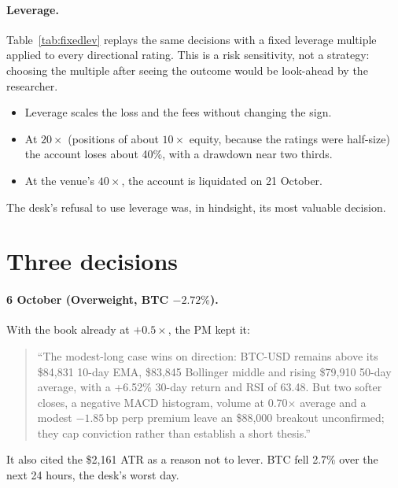 \begin{table}[t]\centering\small
\caption{The primary run's decisions under alternative cost models.}\label{tab:costs}

\end{table}

\paragraph{Leverage.} Table~\ref{tab:fixedlev} replays the same decisions with a fixed leverage multiple applied to every directional rating. This is a risk sensitivity, not a strategy: choosing the multiple after seeing the outcome would be look-ahead by the researcher.
\begin{itemize}
\item Leverage scales the loss and the fees without changing the sign.
\item At $20\times$ (positions of about $10\times$ equity, because the ratings were half-size) the account loses about 40\%, with a drawdown near two thirds.
\item At the venue's $40\times$, the account is liquidated on 21 October.
\end{itemize}
The desk's refusal to use leverage was, in hindsight, its most valuable decision.

\begin{table}[t]\centering\small
\caption{The same decisions with a fixed leverage multiple on every directional rating, with liquidation enforced on 15-minute bars at the venue's maintenance margin.}\label{tab:fixedlev}

\end{table}



\section{Three decisions}\label{sec:cases}

\paragraph{6 October (Overweight, BTC $-2.72\%$).} With the book already at $+0.5\times$, the PM kept it:
\begin{quote}\small
``The modest-long case wins on direction: BTC-USD remains above its \$84,831 10-day EMA, \$83,845 Bollinger middle and rising \$79,910 50-day average, with a +6.52\% 30-day return and RSI of 63.48. But two softer closes, a negative MACD histogram, volume at 0.70$\times$ average and a modest $-1.85$\,bp perp premium leave an \$88,000 breakout unconfirmed; they cap conviction rather than establish a short thesis.''
\end{quote}
It also cited the \$2{,}161 ATR as a reason not to lever. BTC fell 2.7\% over the next 24 hours, the desk's worst day.

